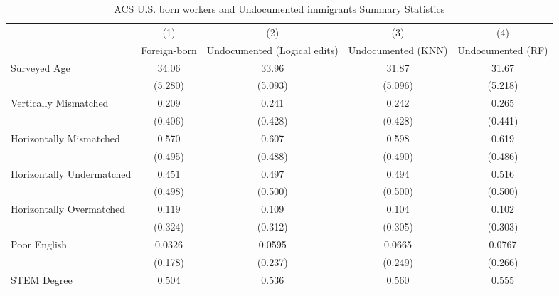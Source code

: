 \begin{table}[htbp]\centering
\def\sym#1{\ifmmode^{#1}\else\(^{#1}\)\fi}
\caption{ACS U.S. born workers and Undocumented immigrants Summary Statistics \label{tab:sum}}
\begin{tabular}{l*{4}{c}}
\hline\hline
                    &\multicolumn{1}{c}{(1)}         &\multicolumn{1}{c}{(2)}         &\multicolumn{1}{c}{(3)}         &\multicolumn{1}{c}{(4)}         \\
                    &Foreign-born         &Undocumented (Logical edits)         &Undocumented (KNN)         &Undocumented (RF)         \\
\hline
Surveyed Age        &       34.06         &       33.96         &       31.87         &       31.67         \\
                    &     (5.280)         &     (5.093)         &     (5.096)         &     (5.218)         \\
[1em]
Vertically Mismatched&       0.209         &       0.241         &       0.242         &       0.265         \\
                    &     (0.406)         &     (0.428)         &     (0.428)         &     (0.441)         \\
[1em]
Horizontally Mismatched&       0.570         &       0.607         &       0.598         &       0.619         \\
                    &     (0.495)         &     (0.488)         &     (0.490)         &     (0.486)         \\
[1em]
Horizontally Undermatched&       0.451         &       0.497         &       0.494         &       0.516         \\
                    &     (0.498)         &     (0.500)         &     (0.500)         &     (0.500)         \\
[1em]
Horizontally Overmatched&       0.119         &       0.109         &       0.104         &       0.102         \\
                    &     (0.324)         &     (0.312)         &     (0.305)         &     (0.303)         \\
[1em]
Poor English        &      0.0326         &      0.0595         &      0.0665         &      0.0767         \\
                    &     (0.178)         &     (0.237)         &     (0.249)         &     (0.266)         \\
[1em]
STEM Degree         &       0.504         &       0.536         &       0.560         &       0.555         \\

\end{tabular}
\end{table}
